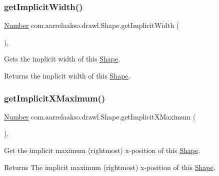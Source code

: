 \subsubsection{\texorpdfstring{get\+Implicit\+Width()}{getImplicitWidth()}}
{\footnotesize\ttfamily \hyperlink{interfacecom_1_1aarrelaakso_1_1drawl_1_1_number}{Number} com.\+aarrelaakso.\+drawl.\+Shape.\+get\+Implicit\+Width (\begin{DoxyParamCaption}{ }\end{DoxyParamCaption})\hspace{0.3cm}{\ttfamily [protected]}, {\ttfamily [inherited]}}



Gets the implicit width of this \hyperlink{classcom_1_1aarrelaakso_1_1drawl_1_1_shape}{Shape}. 

\begin{DoxyReturn}{Returns}
the implicit width of this \hyperlink{classcom_1_1aarrelaakso_1_1drawl_1_1_shape}{Shape}. 
\end{DoxyReturn}
\mbox{\label{classcom_1_1aarrelaakso_1_1drawl_1_1_shape_a0903079fd35e3cfdd6cdc299548a9680}} 
\subsubsection{\texorpdfstring{get\+Implicit\+X\+Maximum()}{getImplicitXMaximum()}}
{\footnotesize\ttfamily \hyperlink{interfacecom_1_1aarrelaakso_1_1drawl_1_1_number}{Number} com.\+aarrelaakso.\+drawl.\+Shape.\+get\+Implicit\+X\+Maximum (\begin{DoxyParamCaption}{ }\end{DoxyParamCaption})\hspace{0.3cm}{\ttfamily [protected]}, {\ttfamily [inherited]}}



Get the implicit maximum (rightmost) x-\/position of this \hyperlink{classcom_1_1aarrelaakso_1_1drawl_1_1_shape}{Shape}. 

\begin{DoxyReturn}{Returns}
The implicit maximum (rightmost) x-\/position of this \hyperlink{classcom_1_1aarrelaakso_1_1drawl_1_1_shape}{Shape}. 
\end{DoxyReturn}
\mbox{\label{classcom_1_1aarrelaakso_1_1drawl_1_1_shape_a264da8a94218b09267c2e177ff0b0951}} 
